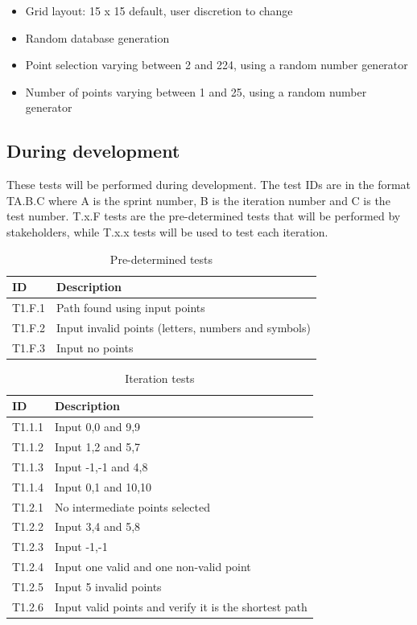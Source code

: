 \begin{itemize}
	\item Grid layout: 15 x 15 default, user discretion to change
	\item Random database generation
	\item Point selection varying between 2 and 224, using a random number generator
	\item Number of points varying between 1 and 25, using a random number generator
\end{itemize}

\subsection{During development}

These tests will be performed during development. The test IDs are in the format TA.B.C where A is the sprint number, B is the iteration number and C is the test number. T.x.F tests are the pre-determined tests that will be performed by stakeholders, while T.x.x tests will be used to test each iteration.

\begin{table}[htbp]
	\centering
	\begin{tabularx}{\textwidth}{|l|X|}
		\hline
		\textbf{ID} & \textbf{Description} \\
		\hline
		T1.F.1 & Path found using input points \\
		\hline
		T1.F.2 & Input invalid points (letters, numbers and symbols) \\
		\hline
		T1.F.3 & Input no points \\
		\hline
	\end{tabularx}
	\caption{Pre-determined tests}
\end{table}

\begin{table}[htbp]
	\centering
	\begin{tabularx}{\textwidth}{|l|X|}
		\hline
		\textbf{ID} & \textbf{Description} \\
		\hline
		T1.1.1 & Input 0,0 and 9,9 \\
		\hline
		T1.1.2 & Input 1,2 and 5,7 \\
		\hline
		T1.1.3 & Input -1,-1 and 4,8 \\
		\hline
		T1.1.4 & Input 0,1 and 10,10 \\
		\hline
		T1.2.1 & No intermediate points selected \\
		\hline
		T1.2.2 & Input 3,4 and 5,8 \\
		\hline
		T1.2.3 & Input -1,-1 \\
		\hline
		T1.2.4 & Input one valid and one non-valid point \\
		\hline
		T1.2.5 & Input 5 invalid points \\
		\hline
		T1.2.6 & Input valid points and verify it is the shortest path \\
		\hline
	\end{tabularx}
	\caption{Iteration tests}
\end{table}


